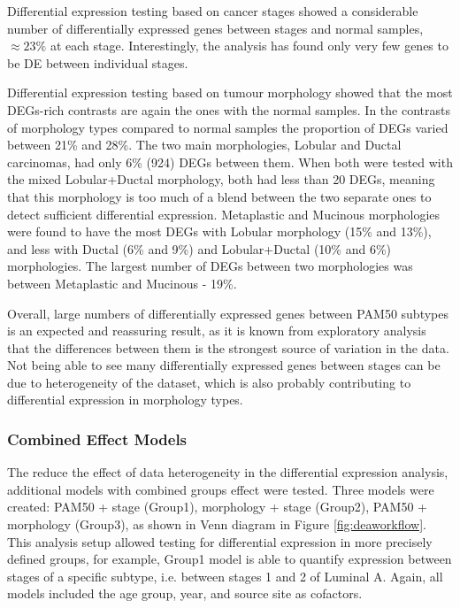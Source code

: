         Differential expression testing based on cancer stages showed a considerable number of differentially expressed genes between stages and normal samples, $\approx 23\%$ at each stage. Interestingly, the analysis has found only very few genes to be DE between individual stages.
        
        Differential expression testing based on tumour morphology showed that the most DEGs-rich contrasts are again the ones with the normal samples. In the contrasts of morphology types compared to normal samples the proportion of DEGs varied between 21\% and 28\%. The two main morphologies, Lobular and Ductal carcinomas,  had only 6\% (924) DEGs between them. When both were tested with the mixed Lobular+Ductal morphology, both had less than 20 DEGs, meaning that this morphology is too much of a blend between the two separate ones to detect sufficient differential expression. Metaplastic and Mucinous morphologies were found to have the most DEGs with Lobular morphology (15\% and 13\%), and less with Ductal (6\% and 9\%) and Lobular+Ductal (10\% and 6\%) morphologies. The largest number of DEGs between two morphologies was between Metaplastic and Mucinous - 19\%. 
        
        Overall, large numbers of differentially expressed genes between PAM50 subtypes is an expected and reassuring result, as it is known from exploratory analysis that the differences between them is the strongest source of variation in the data. Not being able to see many differentially expressed genes between stages can be due to heterogeneity of the dataset, which is also probably contributing to differential expression in morphology types. %

        \subsubsection{Combined Effect Models}
        
        The reduce the effect of data heterogeneity in the differential expression analysis, additional models with combined groups effect were tested. Three models were created: PAM50 + stage (Group1), morphology + stage (Group2), PAM50 + morphology (Group3), as shown in Venn diagram in Figure \ref{fig:deaworkflow}. This analysis setup allowed testing for differential expression in more precisely defined groups,  for example, Group1 model is able to quantify expression between stages of a specific subtype, i.e. between stages 1 and 2 of Luminal A. Again, all models included the age group, year, and source site as cofactors.

